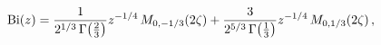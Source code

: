 \[\mathop{\mathrm{Bi}\/}\nolimits\!\left(z\right)=\frac{1}{2^{1/3}\mathop{\Gamma%
\/}\nolimits\!\left(\tfrac{2}{3}\right)}z^{-1/4}\mathop{M_{0,-1/3}\/}\nolimits%
\!\left(2\zeta\right)+\frac{3}{2^{5/3}\mathop{\Gamma\/}\nolimits\!\left(\tfrac%
{1}{3}\right)}z^{-1/4}\mathop{M_{0,1/3}\/}\nolimits\!\left(2\zeta\right),\]